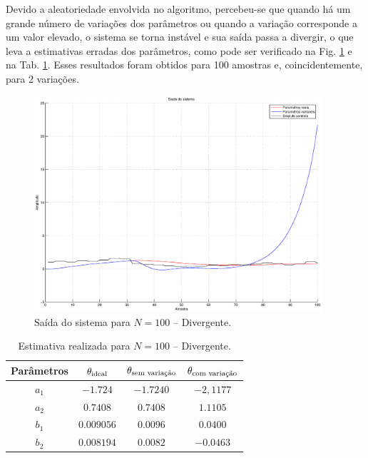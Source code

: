 Devido a aleatoriedade envolvida no algoritmo, percebeu-se que quando há um
grande número de variações dos parâmetros ou quando a variação corresponde a um
valor elevado, o sistema se torna instável e sua saída passa a divergir, o que
leva a estimativas erradas dos parâmetros, como pode ser verificado na Fig.
\ref{fig:saida_sist_100_div} e na Tab. \ref{tab:estimativa_100_div}. Esses
resultados foram obtidos para 100 amostras e, coincidentemente, para 2
variações.

\begin{figure}[htb]
\centering
    \includegraphics[width=0.95\textwidth]{imgs/questao2/saida_100_div}
    \caption{Saída do sistema para $N = 100$ -- Divergente.}
    \label{fig:saida_sist_100_div}
\end{figure}

\begin{table}
\centering
    \caption{Estimativa realizada para $N = 100$ -- Divergente.}
    \label{tab:estimativa_100_div}
    \vspace{0.25cm}
    \begin{tabular}{|c|c|c|c|}
        \hline
        Parâmetros & 
        $\mathbf{\theta}_{\text{ideal}}$&
        $\mathbf{\theta}_{\text{sem variação}}$&
        $\mathbf{\theta}_{\text{com variação}}$\\
        \hline
        \hline
        $a_1$ & $-1.724$   & $-1.7240$ & $-2,1177$ \\
        \hline
        $a_2$ & $0.7408$   & $0.7408$  & $1.1105$ \\
        \hline
        $b_1$ & $0.009056$ & $0.0096$  & $0.0400$ \\
        \hline
        $b_2$ & $0.008194$ & $0.0082$  & $-0.0463$ \\
        \hline
    \end{tabular}
\end{table}

